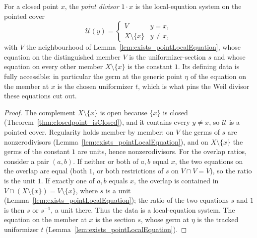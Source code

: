 \begin{definition}
  \label{def:pointDivisor}
  \leanok
  For a closed point \(x\), the \emph{point divisor} \(1 \cdot x\) is the local-equation system on
  the pointed cover
  \[
    \mathcal U(y) = \begin{cases} V & y = x, \\ X \setminus \{x\} & y \neq x, \end{cases}
  \]
  with \(V\) the neighbourhood of Lemma~\ref{lem:exists_pointLocalEquation}, whose equation on the
  distinguished member \(V\) is the uniformizer-section \(s\) and whose equation on every other
  member \(X \setminus \{x\}\) is the constant \(1\). Its defining data is fully accessible: in
  particular the germ at the generic point \(\eta\) of the equation on the member at \(x\) is the
  chosen uniformizer \(t\), which is what pins the Weil divisor these equations cut out.
\end{definition}
\begin{proof}
  \leanok
  The complement \(X \setminus \{x\}\) is open because \(\{x\}\) is closed
  (Theorem~\ref{thm:closedpoint_isClosed}), and it contains every \(y \neq x\), so \(\mathcal U\) is
  a pointed cover. Regularity holds member by member: on \(V\) the germs of \(s\) are
  nonzerodivisors (Lemma~\ref{lem:exists_pointLocalEquation}), and on \(X \setminus \{x\}\) the
  germs of the constant \(1\) are units, hence nonzerodivisors. For the overlap ratios, consider a
  pair \((a, b)\). If neither or both of \(a, b\) equal \(x\), the two equations on the overlap are
  equal (both \(1\), or both restrictions of \(s\) on \(V \cap V = V\)), so the ratio is the unit
  \(1\). If exactly one of \(a, b\) equals \(x\), the overlap is contained in \(V \cap (X \setminus
  \{x\}) = V \setminus \{x\}\), where \(s\) is a unit (Lemma~\ref{lem:exists_pointLocalEquation});
  the ratio of the two equations \(s\) and \(1\) is then \(s\) or \(s^{-1}\), a unit there. Thus the
  data is a local-equation system. The equation on the member at \(x\) is the section \(s\), whose
  germ at \(\eta\) is the tracked uniformizer \(t\) (Lemma~\ref{lem:exists_pointLocalEquation}).
\end{proof}

